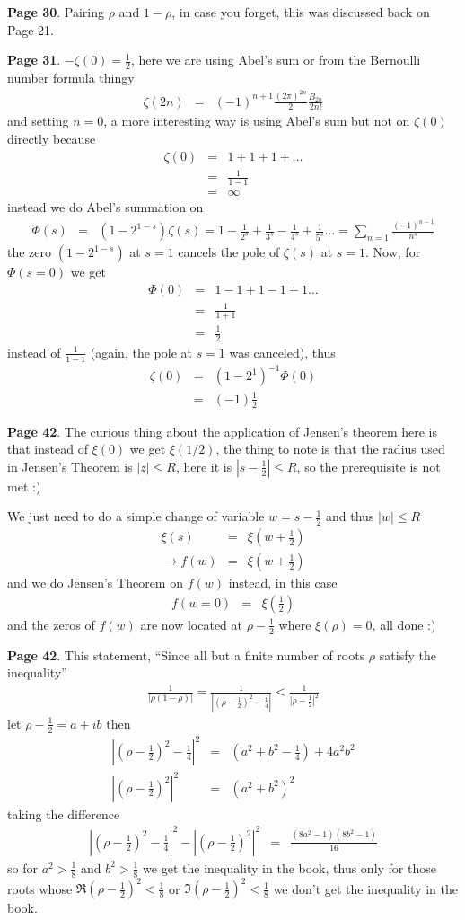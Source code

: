 \documentclass[aps,preprint,preprintnumbers,nofootinbib,showpacs,prd]{revtex4-1}
\newcommand{\nbea}{\begin{eqnarray*}}
\newcommand{\neea}{\end{eqnarray*}}
\begin{document}
{\bf Page 30}. Pairing $\rho$ and $1-\rho$, in case you forget, this was discussed back on Page 21.

{\bf Page 31}. $-\zeta(0) = \frac{1}{2}$, here we are using Abel's sum or from the Bernoulli number formula thingy
%
\nbea
\zeta(2n) & = & (-1)^{n+1} \frac{(2\pi)^{2n}}{2} \frac{B_{2n}}{2n!}
\neea
%
and setting $n = 0$, a more interesting way is using Abel's sum but not on $\zeta(0)$ directly because
%
\nbea
\zeta(0) & = & 1 + 1 + 1 + \dots \\
& = & \frac{1}{1-1} \\
& = & \infty
\neea
%
instead we do Abel's summation on 
%
\nbea
\Phi(s) & = & (1 - 2^{1-s})\zeta(s) = 1 - \frac{1}{2^s} + \frac{1}{3^s} - \frac{1}{4^s} + \frac{1}{5^s} \dots = \sum_{n=1}\frac{(-1)^{n-1}}{n^s}
\neea
%
the zero $(1 - 2^{1-s})$ at $s = 1$ cancels the pole of $\zeta(s)$ at $s=1$. Now, for $\Phi(s=0)$ we get
%
\nbea
\Phi(0) & = & 1 - 1 + 1 - 1 + 1 \dots \\
& = & \frac{1}{1 + 1} \\
& = & \frac{1}{2}
\neea
%
instead of $\frac{1}{1-1}$ (again, the pole at $s = 1$ was canceled), thus
%
\nbea
\zeta(0) & = & (1 - 2^{1})^{-1} \Phi(0) \\
& = & (-1) \frac{1}{2}
\neea
%

{\bf Page 42}. The curious thing about the application of Jensen's theorem here is that instead of $\xi(0)$ we get $\xi(1/2)$, the thing to note is that the radius used in Jensen's Theorem is $|z| \le R$, here it is $|s-\frac{1}{2}| \le R$, so the prerequisite is not met :)

We just need to do a simple change of variable $w = s - \frac{1}{2}$ and thus $|w| \le R$
%
\nbea
\xi(s) & = & \xi(w + \frac{1}{2}) \\
\to f(w) & = & \xi(w + \frac{1}{2})
\neea
%
and we do Jensen's Theorem on $f(w)$ instead, in this case
%
\nbea
f(w = 0) & = & \xi\left(\frac{1}{2}\right)
\neea
%
and the zeros of $f(w)$ are now located at $\rho-\frac{1}{2}$ where $\xi(\rho) = 0$, all done :)

{\bf Page 42}. This statement, ``Since all but a finite number of roots $\rho$ satisfy the inequality''
%
\nbea
\frac{1}{|\rho(1-\rho)|} = \frac{1}{|(\rho-\frac{1}{2})^2 - \frac{1}{4}|} < \frac{1}{|\rho-\frac{1}{2}|^2}
\neea
%
let $\rho - \frac{1}{2} = a + ib$ then
%
\nbea
|(\rho-\frac{1}{2})^2 - \frac{1}{4}|^2 & = & (a^2 + b^2 - \frac{1}{4}) + 4a^2b^2 \\
|(\rho-\frac{1}{2})^2|^2 & = & (a^2 + b^2)^2
\neea
%
taking the difference
%
\nbea
|(\rho-\frac{1}{2})^2 - \frac{1}{4}|^2 - |(\rho-\frac{1}{2})^2|^2 & = & \frac{(8a^2 - 1)(8b^2 - 1)}{16}
\neea
%
so for $a^2 > \frac{1}{8}$ and $b^2 > \frac{1}{8}$ we get the inequality in the book, thus only for those roots whose $\Re(\rho-\frac{1}{2})^2 < \frac{1}{8}$ or $\Im(\rho-\frac{1}{2})^2 < \frac{1}{8}$ we don't get the inequality in the book.
\end{document}
